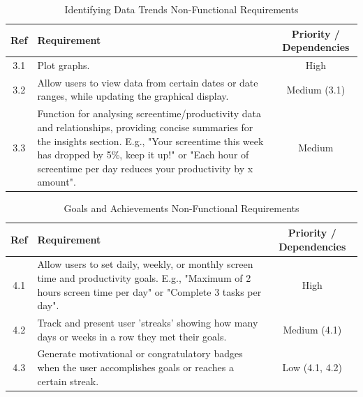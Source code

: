 \documentclass[12pt,a4paper]{article}
\begin{document}
\begin{table}[h]
    \centering
    \small
    \renewcommand{\arraystretch}{1.3}
    \begin{tabular}{|c|p{10cm}|c|}
        \hline
        \textbf{Ref} & \textbf{Requirement} & \textbf{Priority / Dependencies} \\
        \hline
        3.1 & Plot graphs. & High \\
        \hline
        3.2 & Allow users to view data from certain dates or date ranges, while updating the graphical display. & Medium (3.1) \\
        \hline
        3.3 & Function for analysing screentime/productivity data and relationships, providing concise summaries for the insights section.  
        E.g., "Your screentime this week has dropped by 5\%, keep it up!" or "Each hour of screentime per day reduces your productivity by x amount". & Medium \\
        \hline
    \end{tabular}
    \caption{Identifying Data Trends Non-Functional Requirements}
    \label{tab:data_trends}
\end{table}

\begin{table}[h]
    \centering
    \small
    \renewcommand{\arraystretch}{1.3}
    \begin{tabular}{|c|p{10cm}|c|}
        \hline
        \textbf{Ref} & \textbf{Requirement} & \textbf{Priority / Dependencies} \\
        \hline
        4.1 & Allow users to set daily, weekly, or monthly screen time and productivity goals.  
        E.g., "Maximum of 2 hours screen time per day" or "Complete 3 tasks per day". & High \\
        \hline
        4.2 & Track and present user 'streaks' showing how many days or weeks in a row they met their goals. & Medium (4.1) \\
        \hline
        4.3 & Generate motivational or congratulatory badges when the user accomplishes goals or reaches a certain streak. & Low (4.1, 4.2) \\
        \hline
    \end{tabular}
    \caption{Goals and Achievements Non-Functional Requirements}
    \label{tab:goals_achievements}
\end{table}
\newpage
\end{document}
